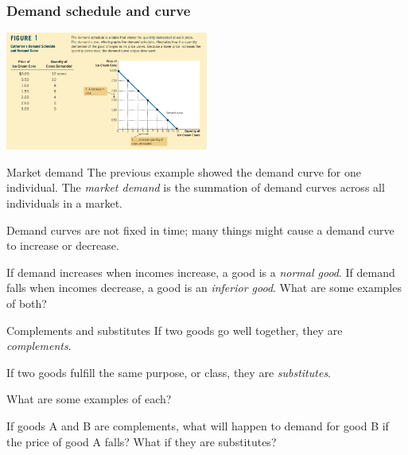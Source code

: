 \documentclass[aspectratio=169]{beamer}
\begin{document}
\begin{frame}
    \frametitle{Demand schedule and curve}
    \centering
    \includegraphics[width = 0.5\textwidth,keepaspectratio]{demand_curve.png}
\end{frame}

\begin{frame}{Market demand}
    The previous example showed the demand curve for one individual. The \textit{market demand} is the summation of demand curves across all individuals in a market.

    \medskip

    Demand curves are not fixed in time; many things might cause a demand curve to increase or decrease. 

    \medskip

    If demand increases when incomes increase, a good is a \textit{normal good}. If demand falls when incomes decrease, a good is an \textit{inferior good}. What are some examples of both?
\end{frame}

\begin{frame}{Complements and substitutes}
    If two goods go well together, they are \textit{complements}.

    \medskip

    If two goods fulfill the same purpose, or class, they are \textit{substitutes}.

    \medskip

    What are some examples of each?

    \medskip

    If goods A and B are complements, what will happen to demand for good B if the price of good A falls? What if they are substitutes?
\end{frame}
\end{document}

